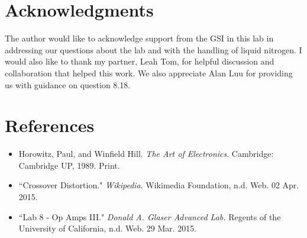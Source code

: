 \documentclass[authoryear, 12pt,5p, times]{elsarticle}
\begin{document}
 \section*{Acknowledgments}
\begin{footnotesize}
The author would like to acknowledge support from the GSI in this lab in addressing our questions about the lab and with the handling of liquid nitrogen. I would also like to thank my partner, Leah Tom, for helpful discussion and collaboration that helped this work. We also appreciate Alan Luu for providing us with guidance on question 8.18.
\end{footnotesize}
  \section*{References}
 \begin{footnotesize}
 \begin{itemize}
 \item Horowitz, Paul, and Winfield Hill. \textit{The Art of Electronics}. Cambridge: Cambridge UP, 1989. Print.
\item ``Crossover Distortion." \textit{Wikipedia}. Wikimedia Foundation, n.d. Web. 02 Apr. 2015.
 \item ``Lab 8 - Op Amps III." \textit{Donald A. Glaser Advanced Lab.} Regents of the University of California, n.d. Web. 29 Mar. 2015.
\end{itemize} 
  \end{footnotesize}
\end{document}
